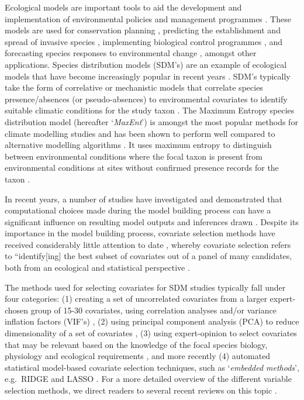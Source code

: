 \documentclass[
  authoryear,
  preprint,
  3p,
  onecolumn]{elsarticle}
\begin{document}
Ecological models are important tools to aid the development and
implementation of environmental policies and management programmes
\citep{Addison2013, Schuwirth2019, Sutton2022}. These models are used
for conservation planning \citep{Guisan2013}, predicting the
establishment and spread of invasive species \citep{Martin2020},
implementing biological control programmes
\citep{Sutton2019b, Mukherjee2021}, and forecasting species responses to
environmental change \citep{Bocedi2014}, amongst other applications.
Species distribution models (SDM's) are an example of ecological models
that have become increasingly popular in recent years \citep{Elith2009}.
SDM's typically take the form of correlative or mechanistic models that
correlate species presence/absences (or pseudo-absences) to
environmental covariates to identify suitable climatic conditions for
the study taxon \citep{Elith2011}. The Maximum Entropy species
distribution model (hereafter `\emph{MaxEnt}') is amongst the most
popular methods for climate modelling studies and has been shown to
perform well compared to alternative modelling algorithms
\citep{Wisz2008, Phillips2017}. It uses maximum entropy to distinguish
between environmental conditions where the focal taxon is present from
environmental conditions at sites without confirmed presence records for
the taxon \citep{Elith2011}.

In recent years, a number of studies have investigated and demonstrated
that computational choices made during the model building process can
have a significant influence on resulting model outputs and inferences
drawn
\citep{Warren2011, Webber2011, Shcheglovitova2013, Boria2017, Sutton2022}.
Despite its importance in the model building process, covariate
selection methods have received considerably little attention to date
\citep[but see][]{Austin2011, Fourcade2018, Adde2023}, whereby covariate
selection refers to ``identify{[}ing{]} the best subset of covariates
out of a panel of many candidates, both from an ecological and
statistical perspective \citep[see][ and references therein]{Adde2023}.

The methods used for selecting covariates for SDM studies typically fall
under four categories: (1) creating a set of uncorrelated covariates
from a larger expert-chosen group of 15-30 covariates, using correlation
analyses and/or variance inflation factors (VIF's) \citep{Dormann2013},
(2) using principal component analysis (PCA) to reduce dimensionality of
a set of covariates \citep{Junior2018}, (3) using expert-opinion to
select covariates that may be relevant based on the knowledge of the
focal species biology, physiology and ecological requirements
\citep{Petitpierre2017, Scherrer2019}, and more recently (4) automated
statistical model-based covariate selection techniques, such as
`\emph{embedded methods}', e.g.~RIDGE and LASSO
\citep{Guisan2002, Guyon2003, Saeys2007, Adde2023}. For a more detailed
overview of the different variable selection methods, we direct readers
to several recent reviews on this topic
\citep{Fois2018, Fourcade2018, Melo-Merino2020}.
\end{document}
